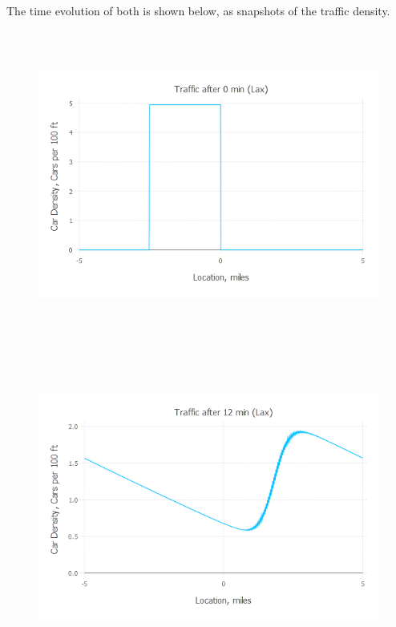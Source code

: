 \documentclass{article}
\begin{document}
The time evolution of both is shown below, as snapshots of the traffic density.

\begin{figure}[H]
	\includegraphics[width=6in,height=4in]{"Traffic after 0 min (Lax)"}
\end{figure}
\begin{figure}[H]
	\includegraphics[width=6in,height=4in]{"Traffic after 12 min (Lax)"}
\end{figure}
\end{document}
